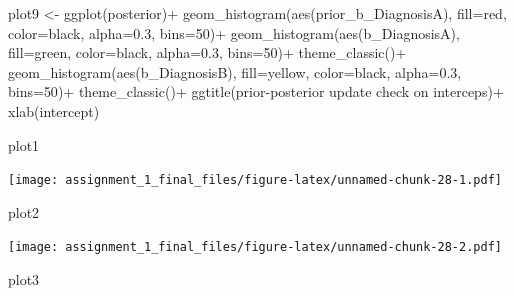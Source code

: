\documentclass[
]{article}
\newenvironment{Shaded}{\begin{snugshade}}{\end{snugshade}}
\newcommand{\AttributeTok}[1]{\textcolor[rgb]{0.77,0.63,0.00}{#1}}
\newcommand{\DecValTok}[1]{\textcolor[rgb]{0.00,0.00,0.81}{#1}}
\newcommand{\FloatTok}[1]{\textcolor[rgb]{0.00,0.00,0.81}{#1}}
\newcommand{\FunctionTok}[1]{\textcolor[rgb]{0.00,0.00,0.00}{#1}}
\newcommand{\NormalTok}[1]{#1}
\newcommand{\OtherTok}[1]{\textcolor[rgb]{0.56,0.35,0.01}{#1}}
\newcommand{\SpecialCharTok}[1]{\textcolor[rgb]{0.00,0.00,0.00}{#1}}
\newcommand{\StringTok}[1]{\textcolor[rgb]{0.31,0.60,0.02}{#1}}
\begin{document}
\begin{Shaded}
\begin{Highlighting}[]
\NormalTok{plot9 }\OtherTok{\textless{}{-}} \FunctionTok{ggplot}\NormalTok{(posterior)}\SpecialCharTok{+}
  \FunctionTok{geom\_histogram}\NormalTok{(}\FunctionTok{aes}\NormalTok{(prior\_b\_DiagnosisA), }\AttributeTok{fill=}\StringTok{\textquotesingle{}red\textquotesingle{}}\NormalTok{, }\AttributeTok{color=}\StringTok{\textquotesingle{}black\textquotesingle{}}\NormalTok{, }\AttributeTok{alpha=}\FloatTok{0.3}\NormalTok{, }\AttributeTok{bins=}\DecValTok{50}\NormalTok{)}\SpecialCharTok{+}
  \FunctionTok{geom\_histogram}\NormalTok{(}\FunctionTok{aes}\NormalTok{(b\_DiagnosisA), }\AttributeTok{fill=}\StringTok{\textquotesingle{}green\textquotesingle{}}\NormalTok{, }\AttributeTok{color=}\StringTok{\textquotesingle{}black\textquotesingle{}}\NormalTok{, }\AttributeTok{alpha=}\FloatTok{0.3}\NormalTok{, }\AttributeTok{bins=}\DecValTok{50}\NormalTok{)}\SpecialCharTok{+}
  \FunctionTok{theme\_classic}\NormalTok{()}\SpecialCharTok{+}
   \FunctionTok{geom\_histogram}\NormalTok{(}\FunctionTok{aes}\NormalTok{(b\_DiagnosisB), }\AttributeTok{fill=}\StringTok{\textquotesingle{}yellow\textquotesingle{}}\NormalTok{, }\AttributeTok{color=}\StringTok{\textquotesingle{}black\textquotesingle{}}\NormalTok{, }\AttributeTok{alpha=}\FloatTok{0.3}\NormalTok{, }\AttributeTok{bins=}\DecValTok{50}\NormalTok{)}\SpecialCharTok{+}
  \FunctionTok{theme\_classic}\NormalTok{()}\SpecialCharTok{+}
  \FunctionTok{ggtitle}\NormalTok{(}\StringTok{\textquotesingle{}prior{-}posterior update check on interceps\textquotesingle{}}\NormalTok{)}\SpecialCharTok{+}
  \FunctionTok{xlab}\NormalTok{(}\StringTok{\textquotesingle{}intercept\textquotesingle{}}\NormalTok{)}


\NormalTok{plot1}
\end{Highlighting}
\end{Shaded}

\texttt{[image: assignment\_1\_final\_files/figure-latex/unnamed-chunk-28-1.pdf]}

\begin{Shaded}
\begin{Highlighting}[]
\NormalTok{plot2}
\end{Highlighting}
\end{Shaded}

\texttt{[image: assignment\_1\_final\_files/figure-latex/unnamed-chunk-28-2.pdf]}

\begin{Shaded}
\begin{Highlighting}[]
\NormalTok{plot3}
\end{Highlighting}
\end{Shaded}
\end{document}
